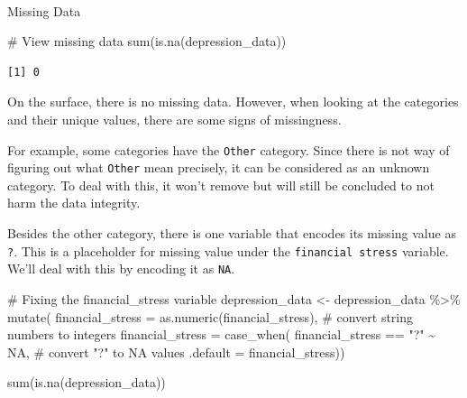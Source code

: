 \documentclass[
  letterpaper,
  DIV=11,
  numbers=noendperiod]{scrartcl}
\makeatletter
\let\oldparagraph\paragraph
\renewcommand{\paragraph}{
    \@ifstar
      \xxxParagraphStar
      \xxxParagraphNoStar
  }
\newcommand{\xxxParagraphStar}[1]{\oldparagraph*{#1}\mbox{}}
\newcommand{\xxxParagraphNoStar}[1]{\oldparagraph{#1}\mbox{}}
\newenvironment{Shaded}{\begin{snugshade}}{\end{snugshade}}
\newcommand{\AttributeTok}[1]{\textcolor[rgb]{0.40,0.45,0.13}{#1}}
\newcommand{\CommentTok}[1]{\textcolor[rgb]{0.37,0.37,0.37}{#1}}
\newcommand{\ConstantTok}[1]{\textcolor[rgb]{0.56,0.35,0.01}{#1}}
\newcommand{\FunctionTok}[1]{\textcolor[rgb]{0.28,0.35,0.67}{#1}}
\newcommand{\NormalTok}[1]{\textcolor[rgb]{0.00,0.23,0.31}{#1}}
\newcommand{\OtherTok}[1]{\textcolor[rgb]{0.00,0.23,0.31}{#1}}
\newcommand{\SpecialCharTok}[1]{\textcolor[rgb]{0.37,0.37,0.37}{#1}}
\newcommand{\StringTok}[1]{\textcolor[rgb]{0.13,0.47,0.30}{#1}}
\makeatother
\begin{document}
\paragraph{Missing Data}\label{missing-data}

\begin{Shaded}
\begin{Highlighting}[numbers=left,,]
\CommentTok{\# View missing data}
\FunctionTok{sum}\NormalTok{(}\FunctionTok{is.na}\NormalTok{(depression\_data))}
\end{Highlighting}
\end{Shaded}

\begin{verbatim}
[1] 0
\end{verbatim}

On the surface, there is no missing data. However, when looking at the
categories and their unique values, there are some signs of missingness.

For example, some categories have the \texttt{Other} category. Since
there is not way of figuring out what \texttt{Other} mean precisely, it
can be considered as an unknown category. To deal with this, it won't
remove but will still be concluded to not harm the data integrity.

Besides the other category, there is one variable that encodes its
missing value as \texttt{?}. This is a placeholder for missing value
under the \texttt{financial\ stress} variable. We'll deal with this by
encoding it as \texttt{NA}.

\begin{Shaded}
\begin{Highlighting}[numbers=left,,]
\CommentTok{\# Fixing the \textasciigrave{}financial\_stress\textasciigrave{} variable}
\NormalTok{depression\_data }\OtherTok{\textless{}{-}}\NormalTok{ depression\_data }\SpecialCharTok{\%\textgreater{}\%}
  \FunctionTok{mutate}\NormalTok{(}
    \AttributeTok{financial\_stress =} \FunctionTok{as.numeric}\NormalTok{(financial\_stress), }
    \CommentTok{\# convert string numbers to integers}
    \AttributeTok{financial\_stress =} \FunctionTok{case\_when}\NormalTok{(}
\NormalTok{      financial\_stress }\SpecialCharTok{==} \StringTok{"?"} \SpecialCharTok{\textasciitilde{}} \ConstantTok{NA}\NormalTok{,}
      \CommentTok{\# convert "?" to NA values}
      \AttributeTok{.default =}\NormalTok{ financial\_stress))}

\FunctionTok{sum}\NormalTok{(}\FunctionTok{is.na}\NormalTok{(depression\_data))}
\end{Highlighting}
\end{Shaded}
\end{document}
